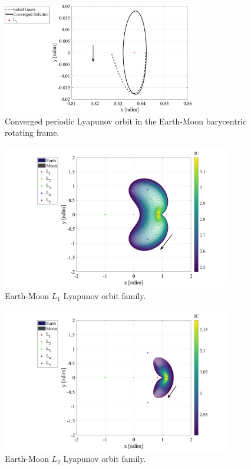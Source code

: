 \begin{figure}[H]
    \centering
    \includegraphics[width=0.75\textwidth]{figures/Lyapunov.pdf}
    \caption{Converged periodic Lyapunov orbit in the Earth-Moon barycentric rotating frame.}
    \label{fig:Lyapunov}
\end{figure}

\begin{figure}[H]
    \centering
    \includegraphics[width=0.9\textwidth]{figures/L1LyapunovFamily.pdf}
    \caption{Earth-Moon $L_{1}$ Lyapunov orbit family.}
    \label{fig:L1Lyapunov}
\end{figure}

\begin{figure}[H]
    \centering
    \includegraphics[width=0.9\textwidth]{figures/L2LyapunovFamily.pdf}
    \caption{Earth-Moon $L_{2}$ Lyapunov orbit family.}
    \label{fig:L2Lyapunov}
\end{figure}

